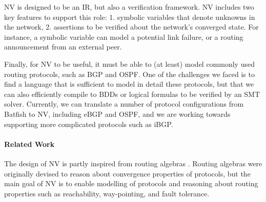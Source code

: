 \documentclass[sigconf,10pt]{acmart}
\begin{document}
NV is designed to be an IR, but also a verification framework. NV
includes two key features to support this role: 1. symbolic variables
that denote unknowns in the network, 2. assertions to be verified
about the network's converged state. For instance, a symbolic variable
can model a potential link failure, or a routing announcement from an
external peer.

Finally, for NV to be useful, it must be able to (at least) model
commonly used routing protocols, such as BGP and OSPF. One of the
challenges we faced is to find a language that is sufficient to model
in detail these protocols, but that we can also
efficiently compile to BDDs or logical formulas to be verified by an
SMT solver. Currently, we can translate a number of protocol
configurations from Batfish to NV, including eBGP and OSPF, and we are
working towards supporting more complicated protocols such as iBGP.

\paragraph{Related Work} The design of NV is partly inspired from
routing algebras \cite{routingalgebra,metarouting}. Routing
algebras were originally devised to reason about convergence
properties of protocols, but the main goal of NV is to enable modelling of
protocols and reasoning about routing properties such as reachability,
way-pointing, and fault tolerance.

 


\end{document}
